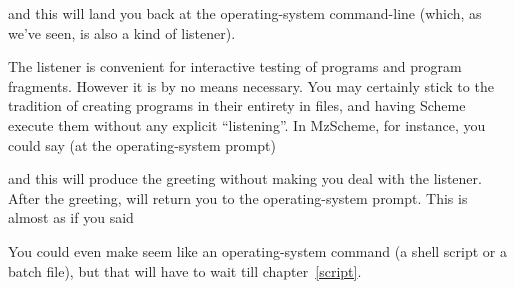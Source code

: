
\n and this will land you back at the operating-system
command-line (which, as we've seen, is also a kind of
listener).

The listener is convenient for interactive testing of
programs and program fragments.  However it is by no
means necessary.  You may certainly stick to the
tradition of creating programs in their entirety in
files, and having Scheme execute them without any
explicit ``listening''.  In MzScheme, for instance, you
could say (at the operating-system prompt)


\n and this will produce the greeting without making you
deal with
the listener.   After the greeting,  will
return you to the
operating-system prompt.  This is almost as if you said


You could even make  seem like an
operating-system command (a shell script or a
batch file), but that will have to wait till
chapter~\ref{script}.

\endinput

One way to do this in the Unix version of
MzScheme is to place the following line at the head of
\p{hello.scm}:

\q{
":";exec mzscheme -r $0 $*
}

\n (This assumes your Unix command shell is either the
Bourne shell or \p{bash}.)

Make the file executable by doing \p{chmod +x
hello.scm}, and then simply type

\p{
hello.scm
}

\n at the Unix prompt.

